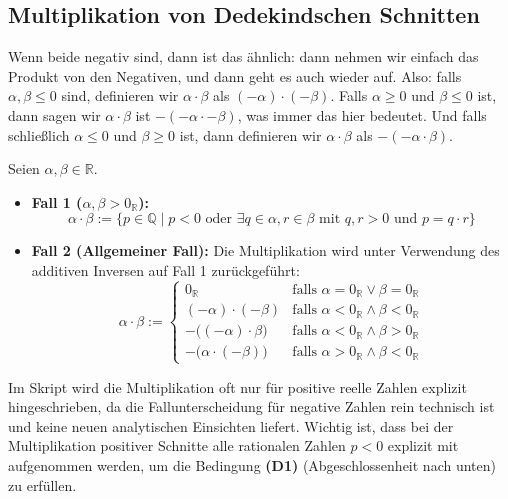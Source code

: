 \subsection{Multiplikation von Dedekindschen Schnitten}

\begin{spoken-clean}[01:07:15 - 01:10:00]
Wenn beide negativ sind, dann ist das ähnlich: dann nehmen wir einfach das Produkt von den Negativen, und dann geht es auch wieder auf. Also: falls $\alpha, \beta \le 0$ sind, definieren wir $\alpha \cdot \beta$ als $(-\alpha) \cdot (-\beta)$. Falls $\alpha \ge 0$ und $\beta \le 0$ ist, dann sagen wir $\alpha \cdot \beta$ ist $-(-\alpha \cdot -\beta)$, was immer das hier bedeutet. Und falls schließlich $\alpha \le 0$ und $\beta \ge 0$ ist, dann definieren wir $\alpha \cdot \beta$ als $-(-\alpha \cdot \beta)$.
\end{spoken-clean}

\begin{math-stroke}
\begin{definition}[Multiplikation]\label{def:multiplikation-reell}
Seien $\alpha, \beta \in \mathbb{R}$.
\begin{itemize}
    \item \textbf{Fall 1 ($\alpha, \beta > 0_{\mathbb{R}}$):}
    \[ \alpha \cdot \beta := \{ p \in \mathbb{Q} \mid p < 0 \text{ oder } \exists q \in \alpha, r \in \beta \text{ mit } q, r > 0 \text{ und } p = q \cdot r \} \]
    \item \textbf{Fall 2 (Allgemeiner Fall):} Die Multiplikation wird unter Verwendung des additiven Inversen auf Fall 1 zurückgeführt:
    \[ \alpha \cdot \beta := \begin{cases} 
    0_{\mathbb{R}} & \text{falls } \alpha = 0_{\mathbb{R}} \lor \beta = 0_{\mathbb{R}} \\
    (-\alpha) \cdot (-\beta) & \text{falls } \alpha < 0_{\mathbb{R}} \land \beta < 0_{\mathbb{R}} \\
    -\bigl((-\alpha) \cdot \beta\bigr) & \text{falls } \alpha < 0_{\mathbb{R}} \land \beta > 0_{\mathbb{R}} \\
    -\bigl(\alpha \cdot (-\beta)\bigr) & \text{falls } \alpha > 0_{\mathbb{R}} \land \beta < 0_{\mathbb{R}}
    \end{cases} \]
\end{itemize}
\end{definition}

\begin{explanation-of-steps}
Im Skript wird die Multiplikation oft nur für positive reelle Zahlen explizit hingeschrieben, da die Fallunterscheidung für negative Zahlen rein technisch ist und keine neuen analytischen Einsichten liefert. Wichtig ist, dass bei der Multiplikation positiver Schnitte alle rationalen Zahlen $p < 0$ explizit mit aufgenommen werden, um die Bedingung \textbf{(D1)} (Abgeschlossenheit nach unten) zu erfüllen.
\end{explanation-of-steps}
\end{math-stroke}

